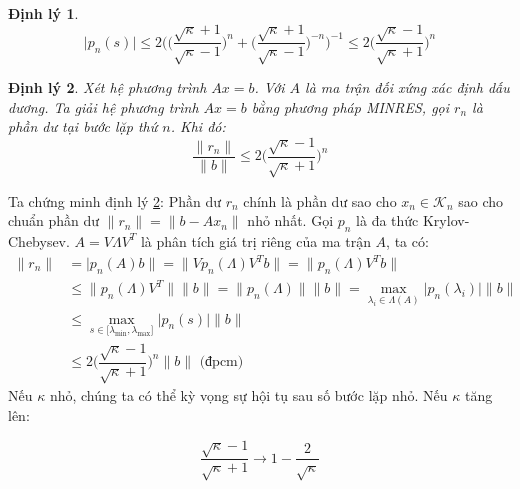\documentclass[14pt, a4paper]{article}
\numberwithin{equation}{section}
\numberwithin{algorithm}{section}
\numberwithin{figure}{section}
\newtheorem{dl}{Định lý}
\numberwithin{dl}{section}
\numberwithin{md}{section}
\numberwithin{bd}{section}
\numberwithin{dn}{section}
\begin{document}
\begin{enumerate}[a)]
\begin{dl}
        \begin{equation}
            \lvert p_n(s) \rvert \leq 2 \Bigg( \Big(\dfrac{\sqrt{\kappa} + 1}{\sqrt{\kappa}-1}\Big)^n + \Big(\dfrac{\sqrt{\kappa} + 1}{\sqrt{\kappa}-1}\Big)^{-n}\Bigg)^{-1} \leq 2 \Big ( \dfrac{\sqrt{\kappa} - 1}{\sqrt{\kappa} + 1} \Big)^n
        \end{equation}
    \end{dl}

    \begin{dl} \label{dl:MINRES-RESIDUAL-CHEBYSEV}
        Xét hệ phương trình $Ax=b$. Với $A$ là ma trận đối xứng xác định dấu dương. Ta giải hệ phương trình $Ax=b$ bằng phương pháp MINRES, gọi $r_n$ là phần dư tại bước lặp thứ $n$. Khi đó:
        \begin{equation} \label{eq:MINRES-A-SPD-UPPER-BOUND}
            \dfrac{\lVert r_n \rVert }{\lVert b \rVert} \leq 2\Big(\dfrac{\sqrt{\kappa} - 1}{\sqrt{\kappa} + 1}\Big)^n
        \end{equation}
    \end{dl}
    Ta chứng minh định lý \ref{dl:MINRES-RESIDUAL-CHEBYSEV}: Phần dư $r_n$ chính là phần dư sao cho $x_n \in \mathcal{K}_n$ sao cho chuẩn phần dư $\lVert r_n \rVert = \lVert b - Ax_n \rVert$ nhỏ nhất. Gọi $p_n$ là đa thức Krylov-Chebysev. $A=V \Lambda V^T$ là phân tích giá trị riêng của ma trận $A$, ta có:
    \begin{equation}
        \begin{aligned}
        \lVert r_n \rVert &= \lvert p_n(A)b \rVert=\lVert V p_n(\Lambda) V^T b \rVert = \lVert p_n(\Lambda) V^T b \rVert \\
        & \leq \lVert p_n(\Lambda) V^T \rVert \lVert b \rVert = \lVert p_n(\Lambda) \rVert \lVert b \rVert = \max_{\lambda_i \in \Lambda(A)} \lvert p_n(\lambda_i) \rvert \lVert b \rVert \\
        & \leq \max_{s \in \lbrack \lambda_{\min}, \lambda_{\max} \rbrack} \lvert p_n(s) \rvert \lVert b \rVert \\
        & \leq 2 \Big( \dfrac{\sqrt{\kappa}-1}{\sqrt{\kappa} + 1}\Big)^n \lVert b \rVert \text{ (đpcm) } 
        \end{aligned}
    \end{equation}
    Nếu $\kappa$ nhỏ, chúng ta có thể kỳ vọng sự hội tụ sau số bước lặp nhỏ. Nếu $\kappa$ tăng lên:

    \begin{equation}
        \dfrac{\sqrt{\kappa}-1}{\sqrt{\kappa} + 1} \rightarrow 1 - \dfrac{2}{\sqrt{\kappa}}
    \end{equation}


\end{enumerate}
\end{document}
